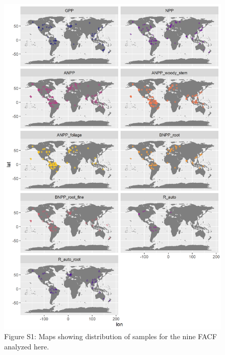\documentclass[]{article}
\begin{document}
\begin{figure}[H]
\includegraphics[width=27.78in,height=0.95\textheight]{tables_figures/distribution_all_samples} \caption{Figure S1: Maps showing distribution of samples for the nine FACF analyzed here.}\label{fig:unnamed-chunk-7}
\end{figure}

\blandscape
\end{document}

